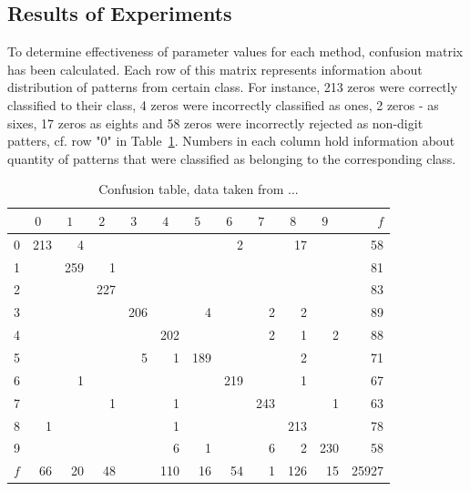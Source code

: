 \documentclass{llncs}
\begin{document}
\subsection{Results of Experiments}
  \label{subsec:ClassificationAndRejection}

To determine effectiveness of parameter values for each method, confusion matrix has been calculated. Each row of this matrix represents information about distribution of patterns from certain class. For instance, 213 zeros were correctly classified to their class, 4 zeros were incorrectly classified as ones, 2 zeros - as sixes, 17 zeros as eights and 58 zeros were incorrectly rejected as non-digit patters, cf. row "0" in Table~\ref{tab:CofusionTable}. Numbers in each column hold information about quantity of patterns that were classified as belonging to the corresponding class.

\begin{table}[h]
\centering
\caption{Confusion table, data taken from ... }
\vspace{-3pt}
\setlength{\tabcolsep}{3pt}
\renewcommand{\arraystretch}{1}
{\footnotesize
\begin{tabular}{|c||r|r|r|r|r|r|r|r|r|r|r|}
\hline
 \hspace{15pt} & $0\;\;\;$ & $1\;\;\;$ & $2\;\;\;$ & $3\;\;\;$ & $4\;\;\;$ & $5\;\;\;$ & $6\;\;\;$ & $7\;\;\;$ & $8\;\;\;$ & $9\;\;\;$ & $f$ \\
\hline\hline
  0 & 213 & 4 &   &   &   &   & 2 &   & 17 &   & 58\\
\hline
  1 &  & 259 & 1 &   &   &   &   &   &   &   & 81\\
\hline
  2 &  &   & 227 &   &   &   &   &   &   &   & 83\\
\hline
  3 &  &   &   & 206 &   & 4 &   & 2 & 2 &   & 89\\
\hline
  4 &  &   &   &   & 202 &   &   & 2 & 1 & 2 & 88\\
\hline
  5 &  &   &   & 5 & 1 & 189 &   &   & 2 &   & 71\\
\hline
  6 &  & 1 &   &   &   &   & 219 &   & 1 &   & 67\\
\hline
  7 &  &   & 1 &   & 1 &   &   & 243 &   & 1 & 63\\
\hline
  8 & 1 &   &   &   & 1 &   &   &   & 213 &   & 78\\
\hline
  9 &  &   &   &   & 6 & 1 &   & 6 & 2 & 230 & 58\\
\hline
$f$ & 66 & 20 & 48 &   & 110  & 16 & 54 & 1 & 126 & 15 & 25927\\
\hline
\end{tabular}
}
\vspace{-3pt}
\label{tab:CofusionTable}
\end{table}
\end{document}
